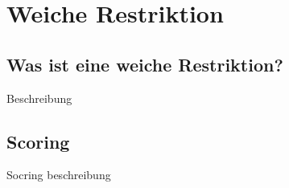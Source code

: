 \section{Weiche Restriktion}\label{sec:Weiche Restriktion}

\subsection{Was ist eine weiche Restriktion?}
Beschreibung
\subsection{Scoring}
Socring beschreibung

